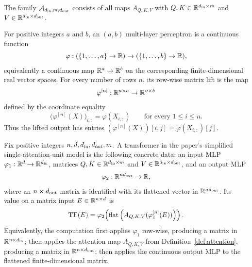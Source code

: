\begin{definition}
  \label{def:attention-family}
  The family $\mathcal A_{d_{\rm in},m,d_{\rm out}}$ consists of all maps
  $A_{Q,K,V}$ with $Q,K\in\mathbb{R}^{d_{\rm in}\times m}$ and
  $V\in\mathbb{R}^{d_{\rm in}\times d_{\rm out}}$.
\end{definition}

\begin{definition}
  \label{def:mlp}
  For positive integers $a$ and $b$, an $(a,b)$ multi-layer perceptron is a
  continuous function
  \[
    \varphi:(\{1,\ldots,a\}\to\mathbb{R})\to(\{1,\ldots,b\}\to\mathbb{R}),
  \]
  equivalently a continuous map $\mathbb{R}^a\to\mathbb{R}^b$ on the corresponding
  finite-dimensional real vector spaces.  For every number of rows $n$, its
  row-wise matrix lift is the map
  \[
    \varphi^{[n]}:\mathbb{R}^{n\times a}\to\mathbb{R}^{n\times b}
  \]
  defined by the coordinate equality
  \[
    \bigl(\varphi^{[n]}(X)\bigr)_{i,:}=\varphi(X_{i,:})
    \qquad\text{for every }1\leq i\leq n.
  \]
  Thus the lifted output has entries
  $(\varphi^{[n]}(X))[i,j]=\varphi(X_{i,:})[j]$.
\end{definition}

\begin{definition}
  \label{def:transformer}
  Fix positive integers $n,d,d_{\rm in},d_{\rm out},m$.  A transformer in the
  paper's simplified single-attention-unit model is the following concrete
  data:
  an input MLP $\varphi_1:\mathbb{R}^d\to\mathbb{R}^{d_{\rm in}}$, matrices
  $Q,K\in\mathbb{R}^{d_{\rm in}\times m}$ and
  $V\in\mathbb{R}^{d_{\rm in}\times d_{\rm out}}$, and an output MLP
  \[
    \varphi_2:\mathbb{R}^{n d_{\rm out}}\to\mathbb{R},
  \]
  where an $n\times d_{\rm out}$ matrix is identified with its flattened
  vector in $\mathbb{R}^{n d_{\rm out}}$.  Its value on a matrix input
  $E\in\mathbb{R}^{n\times d}$ is
  \[
    {\rm TF}(E)=
    \varphi_2\!\left(\operatorname{flat}
      \left(A_{Q,K,V}(\varphi_1^{[n]}(E))\right)\right).
  \]
  Equivalently, the computation first applies $\varphi_1$ row-wise, producing
  a matrix in $\mathbb{R}^{n\times d_{\rm in}}$; then applies the attention map
  $A_{Q,K,V}$ from Definition~\ref{def:attention}, producing a matrix in
  $\mathbb{R}^{n\times d_{\rm out}}$; then applies the continuous output MLP to the
  flattened finite-dimensional matrix.
\end{definition}

